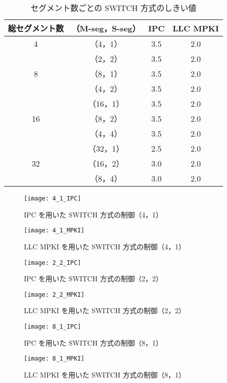 \begin{table}[tb]
  \caption{セグメント数ごとの SWITCH 方式のしきい値}
  \footnotesize
  \center
    \begin{tabular}{c|c|c|c} \hline \hline
    総セグメント数 & （M-seg，S-seg） & IPC & LLC MPKI \\ \hline
    4 &（4，1） & 3.5 & 2.0 \\
    &（2，2） & 3.5 & 2.0 \\ \hline
    8 &（8，1） & 3.5 & 2.0 \\
    &（4，2） & 3.5 & 2.0 \\ \hline
    &（16，1） & 3.5 & 2.0 \\
    16 &（8，2） & 3.5 & 2.0 \\
    &（4，4） & 3.5 & 2.0 \\ \hline
    &（32，1） & 2.5 & 2.0 \\
    32 &（16，2） & 3.0 & 2.0 \\
    &（8，4） & 3.0 & 2.0 \\ \hline
  \end{tabular}
  \label{tab:switch_threshold_all}
\end{table}

\begin{figure}[tb]
  \centering
  \texttt{[image: 4\_1\_IPC]}
  \caption{IPC を用いた SWITCH 方式の制御（4，1）}
  \label{fig:4_1_IPC}

  \centering
  \texttt{[image: 4\_1\_MPKI]}
  \caption{LLC MPKI を用いた SWITCH 方式の制御（4，1）}
  \label{fig:4_1_MPKI}
\end{figure}

\begin{figure}[tb]
  \centering
  \texttt{[image: 2\_2\_IPC]}
  \caption{IPC を用いた SWITCH 方式の制御（2，2）}
  \label{fig:2_2_IPC}

  \centering
  \texttt{[image: 2\_2\_MPKI]}
  \caption{LLC MPKI を用いた SWITCH 方式の制御（2，2）}
  \label{fig:2_2_MPKI}
\end{figure}

\begin{figure}[tb]
  \centering
  \texttt{[image: 8\_1\_IPC]}
  \caption{IPC を用いた SWITCH 方式の制御（8，1）}
  \label{fig:8_1_IPC}

  \centering
  \texttt{[image: 8\_1\_MPKI]}
  \caption{LLC MPKI を用いた SWITCH 方式の制御（8，1）}
  \label{fig:8_1_MPKI}
\end{figure}

